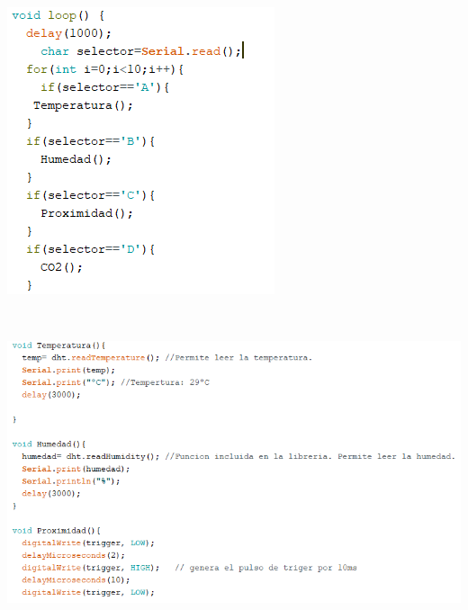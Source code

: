 \documentclass[12pt]{report}
\begin{document}
\begin{center}
\includegraphics[scale=0.8]{Documento/Figuras/13.PNG}
\begin{scriptsize}
\\ 
\end{scriptsize}
\end{center}
\begin{center}
\includegraphics[scale=0.8]{Documento/Figuras/14.PNG}
\begin{scriptsize}
\\ 
\end{scriptsize}
\end{center}
\end{document}
